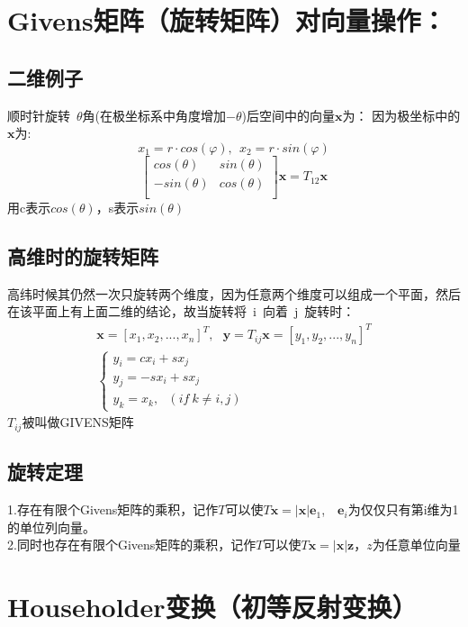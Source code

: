 \documentclass[12pt]{article}
\begin{document}
\begin{CJK*}{UTF8}{gbsn}
\section{Givens矩阵（旋转矩阵）对向量操作：}
\subsection{二维例子}
顺时针旋转~$\theta$角(在极坐标系中角度增加$-\theta$)后空间中的向量$\bm x$为：
因为极坐标中的$\bm x$为:
\begin{equation*}
	x_1=r\cdot cos(\varphi),~~x_2=r\cdot sin(\varphi)
\end{equation*}
\begin{equation}
	\begin{bmatrix}
	cos(\theta)&sin(\theta) \\
	-sin(\theta)& cos(\theta) \\
\end{bmatrix}\bm x=T_{12}\bm x
\end{equation}
用c表示$cos(\theta)$，s表示$sin(\theta)$

\subsection{高维时的旋转矩阵}
高纬时候其仍然一次只旋转两个维度，因为任意两个维度可以组成一个平面，然后在该平面上有上面二维的结论，故当旋转将~i~向着~j~旋转时：
\begin{align*}
	\bm x=[x_1,x_2,...,x_n]^T,~~~\bm y=T_{ij}\bm x=[y_1,y_2,...,y_n]^T\\
	\begin{cases}
		y_i=cx_i+sx_j\\
		y_j=-sx_i+sx_j\\
		y_k=x_k,~~~(if~k\neq i,j)
	\end{cases}
\end{align*}
$T_{ij}$被叫做GIVENS矩阵
\subsection{旋转定理}
1.存在有限个Givens矩阵的乘积，记作$T$可以使$T\bm x=|\bm x|\bm e_1$,~~$\bm e_i$为仅仅只有第i维为1的单位列向量。\\
2.同时也存在有限个Givens矩阵的乘积，记作$T$可以使$T\bm x=|\bm x|\bm z$，$z$为任意单位向量



\section{Householder变换（初等反射变换）}

\end{CJK*}
\end{document}
